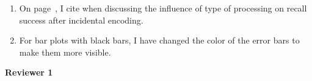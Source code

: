 \documentclass[12pt]{article}
\begin{document}
\begin{enumerate}
\item
	On page~\pageref{newcite}, I cite  when discussing the influence of type of processing on recall success after incidental encoding.

\item
	For bar plots with black bars, I have changed the color of the error bars to make them more visible. 


\end{enumerate}


\vspace{20pt}

\textbf{\large{Reviewer 1}}
\end{document}
